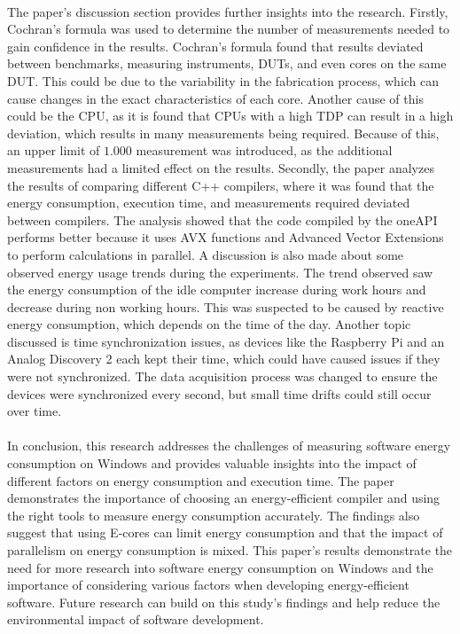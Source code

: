 \paragraph*{}
The paper's discussion section provides further insights into the research. Firstly, Cochran's formula was used to determine the number of measurements needed to gain confidence in the results. Cochran's formula found that results deviated between benchmarks, measuring instruments, DUTs, and even cores on the same DUT. This could be due to the variability in the fabrication process, which can cause changes in the exact characteristics of each core. Another cause of this could be the CPU, as it is found that CPUs with a high TDP can result in a high deviation, which results in many measurements being required. Because of this, an upper limit of $1.000$ measurement was introduced, as the additional measurements had a limited effect on the results. Secondly, the paper analyzes the results of comparing different C++ compilers, where it was found that the energy consumption, execution time, and measurements required deviated between compilers. The analysis showed that the code compiled by the oneAPI performs better because it uses AVX functions and Advanced Vector Extensions to perform calculations in parallel. A discussion is also made about some observed energy usage trends during the experiments. The trend observed saw the energy consumption of the idle computer increase during work hours and decrease during non working hours. This was suspected to be caused by reactive energy consumption, which depends on the time of the day. Another topic discussed is time synchronization issues, as devices like the Raspberry Pi and an Analog Discovery 2 each kept their time, which could have caused issues if they were not synchronized. The data acquisition process was changed to ensure the devices were synchronized every second, but small time drifts could still occur over time.

\paragraph*{}
In conclusion, this research addresses the challenges of measuring software energy consumption on Windows and provides valuable insights into the impact of different factors on energy consumption and execution time. The paper demonstrates the importance of choosing an energy-efficient compiler and using the right tools to measure energy consumption accurately. The findings also suggest that using E-cores can limit energy consumption and that the impact of parallelism on energy consumption is mixed. This paper's results demonstrate the need for more research into software energy consumption on Windows and the importance of considering various factors when developing energy-efficient software. Future research can build on this study's findings and help reduce the environmental impact of software development. 


